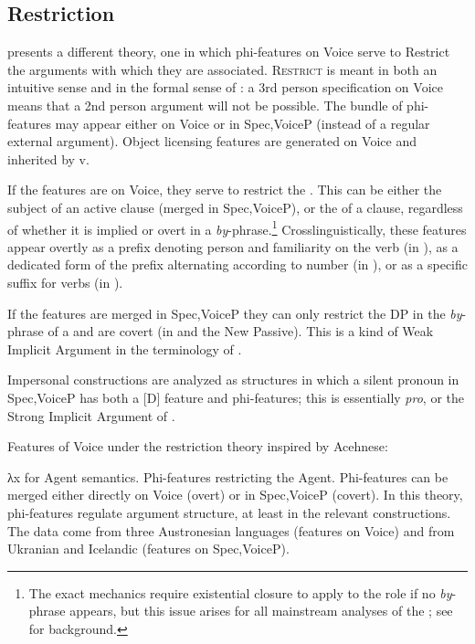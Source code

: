 \begin{exe}
\begin{xlist}
\begin{xlist}
\begin{xlist}
\begin{xlist}
\begin{xlist}
\begin{xlist}
\begin{exe}
\begin{xlist}
\begin{exe}
\begin{exe}
\begin{xlist}
\begin{exe}
\begin{exe}
\begin{xlist}
\begin{exe}
\begin{xlist}
\begin{exe}
\begin{xlist}
\begin{exe}
\begin{xlist}
\begin{exe}
\begin{xlist}
\begin{exe}
\begin{xlist}
	\subsection{Restriction}
\cite{legate12lang,legate14} presents a different theory, one in which phi-features on Voice serve to Restrict the arguments with which they are associated. \textsc{Restrict} is meant in both an intuitive sense and in the formal sense of \cite{chungladusaw04}: a 3rd person specification on Voice means that a 2nd person argument will not be possible. The bundle of phi-features may appear either on Voice or in Spec,VoiceP (instead of a regular external argument). Object licensing features are generated on Voice and inherited by v.

If the features are on Voice, they serve to restrict the . This can be either the subject of an active clause (merged in Spec,VoiceP), or the  of a  clause, regardless of whether it is implied or overt in a \emph{by}-phrase.\footnote{The exact mechanics require existential closure to apply to the  role if no \emph{by}-phrase appears, but this issue arises for all mainstream analyses of the ; see \cite{williams15} for background.} Crosslinguistically, these features appear overtly as a prefix denoting person and familiarity on the verb (in ), as a dedicated form of the  prefix alternating according to number (in ), or as a specific suffix for   verbs (in ).

If the features are merged in Spec,VoiceP they can only restrict the DP in the \emph{by}-phrase of a  and are covert (in  and the  New Passive). This is a kind of Weak Implicit Argument in the terminology of \cite{landau10}.

Impersonal constructions are analyzed as structures in which a silent pronoun in Spec,VoiceP has both a [D] feature and phi-features; this is essentially \textit{pro}, or the Strong Implicit Argument of \cite{landau10}.
 \begin{exe}
 \ex  Features of Voice under the restriction theory inspired by Acehnese: 
 \begin{xlist} 
 	\ex  λx for Agent semantics. 
 	\ex  Phi-features restricting the Agent. 
 	\ex  Phi-features can be merged either directly on Voice (overt) or in Spec,VoiceP (covert). 
 \z
\z 
In this theory, phi-features regulate argument structure, at least in the relevant constructions. The data come from three Austronesian languages (features on Voice) and from Ukranian and Icelandic (features on Spec,VoiceP).


\end{xlist}
\end{exe}
\end{xlist}
\end{exe}
\end{xlist}
\end{exe}
\end{xlist}
\end{exe}
\end{xlist}
\end{exe}
\end{xlist}
\end{exe}
\end{xlist}
\end{exe}
\end{exe}
\end{xlist}
\end{exe}
\end{exe}
\end{xlist}
\end{exe}
\end{xlist}
\end{xlist}
\end{xlist}
\end{xlist}
\end{xlist}
\end{xlist}
\end{exe}
